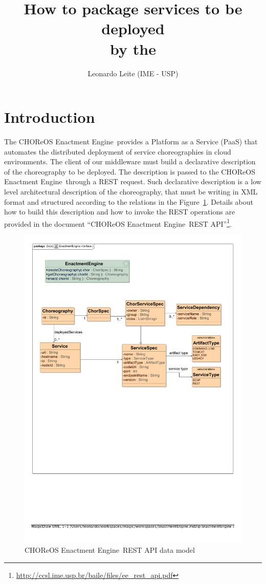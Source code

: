 \documentclass[a4paper, 10pt]{article}
\title{How to package services to be deployed \\ by the \ee}
\author{Leonardo Leite (IME - USP)}
\newcommand{\ee}{CHOReOS Enactment Engine}
\begin{document}
\maketitle

\section{Introduction}

The \ee\ provides a Platform as a Service (PaaS) that automates the distributed deployment of service choreographies in cloud environments. The client of our middleware must build a declarative description of the choreography to be deployed. The description is passed to the \ee\ through a REST request. Such declarative description is a low level architectural description of the choreography, that must be writing in XML format and structured according to the relations in the Figure~\ref{img:data_model}. Details about how to build this description and how to invoke the REST operations are provided in the document ``\ee\ REST API''\footnote{\url{http://ccsl.ime.usp.br/baile/files/ee\_rest\_api.pdf}}. 

\begin{figure}[th]
\centering
\includegraphics[scale=0.75]{img/data_model.pdf}
\caption{\ee\ REST API data model}
\label{img:data_model}
\end{figure}
\end{document}
